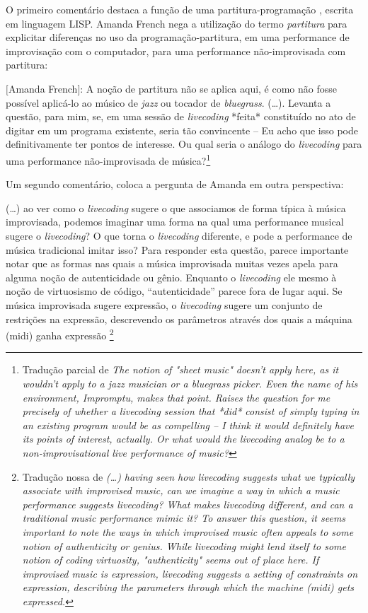 \documentclass[
	12pt,				%
	openright,			%
	twoside,			%
	a4paper,			%
	english,			%
	french,				%
	spanish,			%
        italian,                        %
	brazil				%
	]{abntex2}
\begin{document}
O primeiro comentário destaca a função de uma partitura-programação \cite[p.~5]{fenerich_marulho_2014}, escrita em linguagem LISP. Amanda French nega a utilização do termo \emph{partitura} para explicitar diferenças no uso da programação-partitura, em uma performance de improvisação com o computador, para uma performance não-improvisada com partitura:

\begin{citacao}
$[$Amanda French$]$: A noção de partitura não se aplica aqui, é como não fosse possível aplicá-lo ao músico de \emph{jazz} ou tocador de \emph{bluegrass}. (\ldots). Levanta a questão, para mim, se, em uma sessão de \emph{livecoding} *feita* constituído no ato de digitar em um programa existente, seria tão convincente -- Eu acho que isso pode definitivamente ter pontos de interesse. Ou qual seria o análogo do \emph{livecoding} para uma performance não-improvisada de música?\footnote{Tradução parcial de \emph{The notion of "sheet music" doesn't apply here, as it wouldn't apply to a jazz musician or a bluegrass picker. Even the name of his environment, Impromptu, makes that point. Raises the question for me precisely of whether a livecoding session that *did* consist of simply typing in an existing program would be as compelling -- I think it would definitely have its points of interest, actually. Or what would the livecoding analog be to a non-improvisational live performance of music?}}
\end{citacao}

Um segundo comentário, coloca a pergunta de Amanda em outra perspectiva:

\begin{citacao}
(\ldots) ao ver como o \emph{livecoding} sugere o que associamos de forma típica à música improvisada, podemos imaginar uma forma na qual uma performance musical sugere o \emph{livecoding}? O que torna o \emph{livecoding} diferente, e pode a performance de música tradicional imitar isso? Para responder esta questão, parece importante notar que as formas nas quais a música improvisada muitas vezes apela para alguma noção de autenticidade ou gênio. Enquanto o \emph{livecoding} ele mesmo à noção de virtuosismo de código, ``autenticidade'' parece fora de lugar aqui. Se música improvisada sugere expressão, o \emph{livecoding} sugere um conjunto de restrições na expressão, descrevendo os parâmetros através dos quais a máquina (midi) ganha expressão \footnote{Tradução nossa de \emph{(\ldots) having seen how livecoding suggests what we typically associate with improvised music, can we imagine a way in which a music performance suggests livecoding? What makes livecoding different, and can a traditional music performance mimic it? To answer this question, it seems important to note the ways in which improvised music often appeals to some notion of authenticity or genius. While livecoding might lend itself to some notion of coding virtuosity, "authenticity" seems out of place here. If improvised music is expression, livecoding suggests a setting of constraints on expression, describing the parameters through which the machine (midi) gets expressed.}}
\end{citacao}
\end{document}

